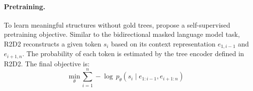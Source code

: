 
\paragraph{Pretraining.}


To learn meaningful structures without gold trees,  propose a self-supervised pretraining objective. Similar to the bidirectional masked language model task, R2D2 reconstructs a given token $s_i$ based on its context representation $e_{1,i-1}$ and $e_{i+1, n}$. The probability of each token is estimated by the tree encoder defined in R2D2. The final objective is:
\begin{equation}
\label{eq:bilm_loss}
\underset{\theta}{\mathrm{min}}\,\sum_{i=1}^{n} -\log\,p_{\theta}(s_{i} \mid e_{1:i-1}, e_{i+1:n})
\end{equation}